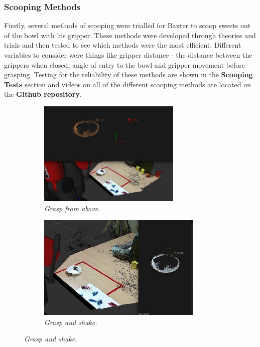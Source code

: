 \subsubsection{Scooping Methods}
Firstly, several methods of scooping were trialled for Baxter to scoop sweets out of the bowl with his gripper. These methods were developed through theories and trials and then tested to see which methods were the most efficient.  Different variables to consider were things like gripper distance - the distance between the grippers when closed, angle of entry to the bowl and gripper movement before grasping. Testing for the reliability of these methods are shown in the \hyperref[sssec:ScoopTest]{\textbf{Scooping Tests}} section and videos on all of the different scooping methods are located on the \textbf{Github repository}.\begin{figure}[ht!]
    \centering
    \begin{subfigure}[b]{0.475\textwidth}
        \centering
        \includegraphics[width=\textwidth, height=5cm]{regiongrowing.jpg}
        \caption{\textit{Grasp from above.}}
    \end{subfigure}
    \hfill
    \begin{subfigure}[b]{0.475\textwidth}  
        \centering 
        \includegraphics[width=\textwidth, height=5cm]{whitecloud.jpg}
        \caption{\textit{Grasp and shake.}}
    \end{subfigure}
\end{figure}
\newline\newline
